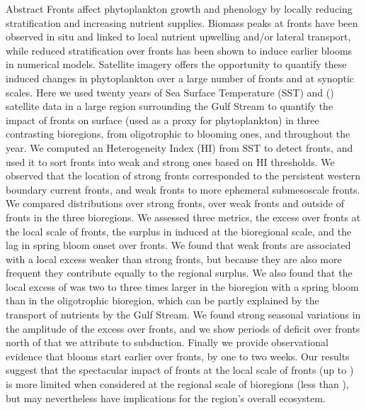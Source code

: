 \begin{articleBlock}{Abstract}
  Fronts affect phytoplankton growth and phenology by locally reducing stratification and increasing nutrient supplies.
  Biomass peaks at fronts have been observed in situ and linked to local nutrient upwelling and/or lateral transport, while reduced stratification over fronts has been shown to induce earlier blooms in numerical models.
  Satellite imagery offers the opportunity to quantify these induced changes in phytoplankton over a large number of fronts and at synoptic scales.
  Here we used twenty years of Sea Surface Temperature (SST) and  () satellite data in a large region surrounding the Gulf Stream to quantify the impact of fronts on surface  (used as a proxy for phytoplankton) in three contrasting bioregions, from oligotrophic to blooming ones, and throughout the year.
  We computed an Heterogeneity Index (HI) from SST to detect fronts, and used it to sort fronts into weak and strong ones based on HI thresholds.
  We observed that the location of strong fronts corresponded to the persistent western boundary current fronts, and weak fronts to more ephemeral submesoscale fronts.
  We compared  distributions over strong fronts, over weak fronts and outside of fronts in the three bioregions.
  We assessed three metrics, the  excess over fronts at the local scale of fronts, the surplus in  induced at the bioregional scale, and the lag in spring bloom onset over fronts.
  We found that weak fronts are associated with a local  excess weaker than strong fronts, but because they are also more frequent they contribute equally to the regional  surplus.
  We also found that the local excess of  was two to three times larger in the bioregion with a spring bloom than in the oligotrophic bioregion, which can be partly explained by the transport of nutrients by the Gulf Stream.
  We found strong seasonal variations in the amplitude of the  excess over fronts, and we show periods of  deficit over fronts north of  that we attribute to subduction.
  Finally we provide observational evidence that blooms start earlier over fronts, by one to two weeks.
  Our results suggest that the spectacular impact of fronts at the local scale of fronts (up to ) is more limited when considered at the regional scale of bioregions (less than ), but may nevertheless have implications for the region's overall ecosystem.
\end{articleBlock}


